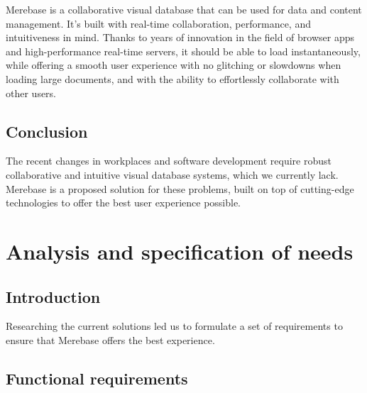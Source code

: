 \documentclass[
  12pt,
  a4paper,
]{article}
\begin{document}
Merebase is a collaborative visual database that can be used for data
and content management. It's built with real-time collaboration,
performance, and intuitiveness in mind. Thanks to years of innovation in
the field of browser apps and high-performance real-time servers, it
should be able to load instantaneously, while offering a smooth user
experience with no glitching or slowdowns when loading large documents,
and with the ability to effortlessly collaborate with other users.

\hypertarget{conclusion}{%
\subsection{Conclusion}\label{conclusion}}

The recent changes in workplaces and software development require robust
collaborative and intuitive visual database systems, which we currently
lack. Merebase is a proposed solution for these problems, built on top
of cutting-edge technologies to offer the best user experience possible.

\hypertarget{analysis-and-specification-of-needs}{%
\section{Analysis and specification of
needs}\label{analysis-and-specification-of-needs}}

\hypertarget{introduction-2}{%
\subsection{Introduction}\label{introduction-2}}

Researching the current solutions led us to formulate a set of
requirements to ensure that Merebase offers the best experience.

\hypertarget{functional-requirements}{%
\subsection{Functional requirements}\label{functional-requirements}}
\end{document}
